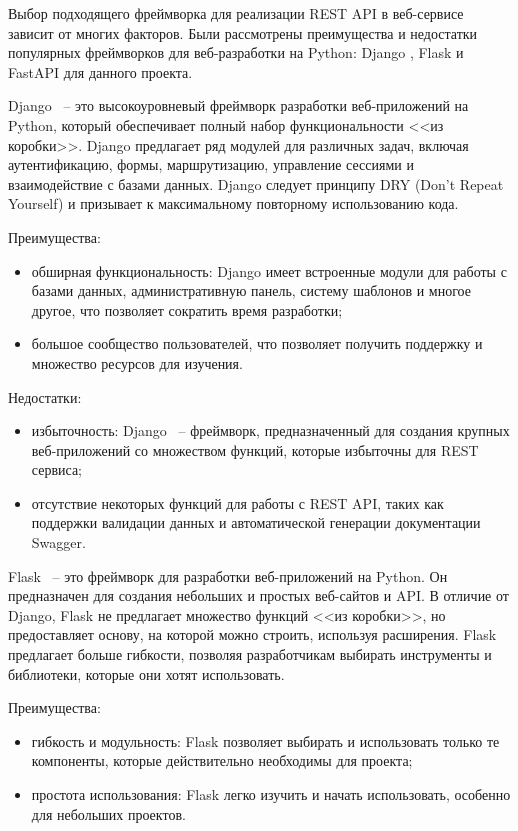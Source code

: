 Выбор подходящего фреймворка для реализации REST API в веб-сервисе зависит от многих факторов. Были рассмотрены преимущества и недостатки популярных фреймворков для веб-разработки на Python: Django \cite{django}, Flask \cite{flask} и FastAPI \cite{fastapi} для данного проекта.

Django ~-- это высокоуровневый фреймворк разработки веб-приложений на Python, который обеспечивает полный набор функциональности <<из коробки>>. Django предлагает ряд модулей для различных задач, включая аутентификацию, формы, маршрутизацию, управление сессиями и взаимодействие с базами данных. Django следует принципу DRY (Don't Repeat Yourself) и призывает к максимальному повторному использованию кода.

Преимущества:
\begin{itemize}
    \item обширная функциональность: Django имеет встроенные модули для работы с базами данных, административную панель, систему шаблонов и многое другое, что позволяет сократить время разработки;
    \item большое сообщество пользователей, что позволяет получить поддержку и множество ресурсов для изучения.
\end{itemize}

Недостатки:
\begin{itemize}
    \item избыточность: Django ~-- фреймворк, предназначенный для создания крупных веб-приложений со множеством функций, которые избыточны для REST сервиса;
    \item отсутствие некоторых функций для работы с REST API, таких как поддержки валидации данных и автоматической генерации документации Swagger.
\end{itemize}

Flask ~-- это фреймворк для разработки веб-приложений на Python. Он предназначен для создания небольших и простых веб-сайтов и API. В отличие от Django, Flask не предлагает множество функций <<из коробки>>, но предоставляет основу, на которой можно строить, используя расширения. Flask предлагает больше гибкости, позволяя разработчикам выбирать инструменты и библиотеки, которые они хотят использовать.

Преимущества:
\begin{itemize}
    \item гибкость и модульность: Flask позволяет выбирать и использовать только те компоненты, которые действительно необходимы для проекта;
    \item простота использования: Flask легко изучить и начать использовать, особенно для небольших проектов.
\end{itemize}

